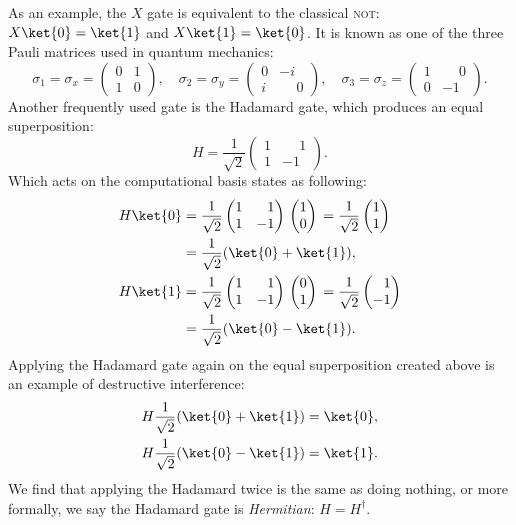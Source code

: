 \documentclass[a4paper,10pt]{article}
\newcommand{\qstatezero}{
	\begin{pmatrix}1 \\ 0\end{pmatrix}
}
\newcommand{\qstateone}{
	\begin{pmatrix}0 \\ 1\end{pmatrix}
}
\newcommand{\hgate}{
	\dfrac{1}{\sqrt2}
	\begin{pmatrix}
		1 & \phantom{-}1 \\
		1 & -1
	\end{pmatrix}
}
\begin{document}
As an example, the $X$ gate is equivalent to the classical \textsc{not}: $X\ket{0} = \ket{1}$ and $X\ket{1} = \ket{0}$.
It is known as one of the three Pauli matrices used in quantum mechanics:
\begin{equation}
\sigma_1 = \sigma_x =
\begin{pmatrix}
0 & 1 \\
1 & 0
\end{pmatrix},
\quad
\sigma_2 = \sigma_y =
\begin{pmatrix}
0 & -i \\
i & \phantom{-}0
\end{pmatrix},
\quad
\sigma_3 = \sigma_z =
\begin{pmatrix}
1 & \phantom{-}0 \\
0 & -1
\end{pmatrix}.
\end{equation}
Another frequently used gate is the Hadamard gate, which produces an equal superposition:
\begin{equation}
H = \hgate{}.
\end{equation}
Which acts on the computational basis states as following:
\begin{equation}
\begin{aligned}
H\ket{0} &=
\hgate{}
\qstatezero{}
=
\dfrac{1}{\sqrt2}
\begin{pmatrix}1 \\ 1\end{pmatrix} \\
&= \dfrac{1}{\sqrt2}(\ket{0} + \ket{1}), \\
H\ket{1} &=
\hgate{}
\qstateone{}
=
\dfrac{1}{\sqrt2}
\begin{pmatrix}\phantom{-}1 \\ -1\end{pmatrix} \\
&= \dfrac{1}{\sqrt2}(\ket{0} - \ket{1}).
\end{aligned}
\end{equation}
Applying the Hadamard gate again on the equal superposition created above is an example of destructive interference:
\begin{equation}
\begin{aligned}
H\dfrac{1}{\sqrt2}(\ket{0} + \ket{1}) &= \ket{0}, \\
H\dfrac{1}{\sqrt2}(\ket{0} - \ket{1}) &= \ket{1}.
\end{aligned}
\end{equation}
We find that applying the Hadamard twice is the same as doing nothing, or more formally, we say the Hadamard gate is \emph{Hermitian}: $H = H^\dagger$.
\end{document}
